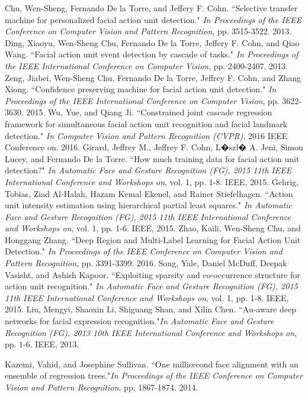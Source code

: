 \documentclass[a4paper, 10pt, conference]{ieeeconf}      %
\begin{document}
\begin{thebibliography}{99}
Chu, Wen-Sheng, Fernando De la Torre, and Jeffery F. Cohn. ``Selective transfer machine for personalized facial action unit detection." {\it In Proceedings of the IEEE Conference on Computer Vision and Pattern Recognition}, pp. 3515-3522. 2013.
Ding, Xiaoyu, Wen-Sheng Chu, Fernando De la Torre, Jeffery F. Cohn, and Qiao Wang. ``Facial action unit event detection by cascade of tasks." {\it In Proceedings of the IEEE International Conference on Computer Vision}, pp. 2400-2407. 2013.
Zeng, Jiabei, Wen-Sheng Chu, Fernando De la Torre, Jeffrey F. Cohn, and Zhang Xiong. ``Confidence preserving machine for facial action unit detection." {\it In Proceedings of the IEEE International Conference on Computer Vision}, pp. 3622-3630. 2015.
Wu, Yue, and Qiang Ji. ``Constrained joint cascade regression framework for simultaneous facial action unit recognition and facial landmark detection." {\it In Computer Vision and Pattern Recognition (CVPR)}, 2016 IEEE Conference on. 2016.
Girard, Jeffrey M., Jeffrey F. Cohn, L�szl� A. Jeni, Simon Lucey, and Fernando De la Torre. ``How much training data for facial action unit detection?" {\it In Automatic Face and Gesture Recognition (FG), 2015 11th IEEE International Conference and Workshops on}, vol. 1, pp. 1-8. IEEE, 2015.
Gehrig, Tobias, Ziad Al-Halah, Hazam Kemal Ekenel, and Rainer Stiefelhagen. ``Action unit intensity estimation using hierarchical partial least squares." {\it In Automatic Face and Gesture Recognition (FG), 2015 11th IEEE International Conference and Workshops on}, vol. 1, pp. 1-6. IEEE, 2015.
Zhao, Kaili, Wen-Sheng Chu, and Honggang Zhang. ``Deep Region and Multi-Label Learning for Facial Action Unit Detection." {\it In Proceedings of the IEEE Conference on Computer Vision and Pattern Recognition}, pp. 3391-3399. 2016.
Song, Yale, Daniel McDuff, Deepak Vasisht, and Ashish Kapoor. ``Exploiting sparsity and co-occurrence structure for action unit recognition." {\it In Automatic Face and Gesture Recognition (FG), 2015 11th IEEE International Conference and Workshops on}, vol. 1, pp. 1-8. IEEE, 2015.
Liu, Mengyi, Shaoxin Li, Shiguang Shan, and Xilin Chen. ``Au-aware deep networks for facial expression recognition."{\it  In Automatic Face and Gesture Recognition (FG), 2013 10th IEEE International Conference and Workshops on}, pp. 1-6. IEEE, 2013.

Kazemi, Vahid, and Josephine Sullivan. ``One millisecond face alignment with an ensemble of regression trees."{\it  In Proceedings of the IEEE Conference on Computer Vision and Pattern Recognition}, pp. 1867-1874. 2014.


\end{thebibliography}
\end{document}
